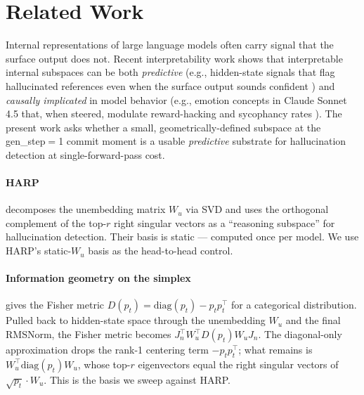 \documentclass[10pt, letterpaper]{article}
\newcommand{\Wu}{W_u}
\newcommand{\Jn}{J_n}
\begin{document}
\section{Related Work}
\label{sec:related}

Internal representations of large language models often carry signal
that the surface output does not. Recent interpretability work shows
that interpretable internal subspaces can be both \emph{predictive}
(e.g., hidden-state signals that flag hallucinated references even
when the surface output sounds confident
\citep{agrawal2024hallucinated}) and \emph{causally implicated} in
model behavior (e.g., emotion concepts in Claude Sonnet 4.5 that, when
steered, modulate reward-hacking and sycophancy rates
\citep{sofroniew2026emotions}). The present work asks whether a
small, geometrically-defined subspace at the gen\_step$=$1 commit
moment is a usable \emph{predictive} substrate for hallucination
detection at single-forward-pass cost.

\paragraph{HARP \citep{hu2025harp}} decomposes the unembedding matrix
$\Wu$ via SVD and uses the orthogonal complement of the top-$r$ right
singular vectors as a ``reasoning subspace'' for hallucination
detection. Their basis is static --- computed once per model. We use
HARP's static-$\Wu$ basis as the head-to-head control.

\paragraph{Information geometry on the simplex
\citep{amari2016information}} gives the Fisher metric $D(p_t) =
\mathrm{diag}(p_t) - p_t p_t^\top$ for a categorical distribution.
Pulled back to hidden-state space through the unembedding $\Wu$ and
the final RMSNorm, the Fisher metric becomes $\Jn^\top \Wu^\top D(p_t)
\Wu \Jn$. The diagonal-only approximation drops the rank-1 centering
term $-p_t p_t^\top$; what remains is $\Wu^\top \mathrm{diag}(p_t)
\Wu$, whose top-$r$ eigenvectors equal the right singular vectors of
$\sqrt{p_t} \cdot \Wu$. This is the basis we sweep against HARP.
\end{document}
